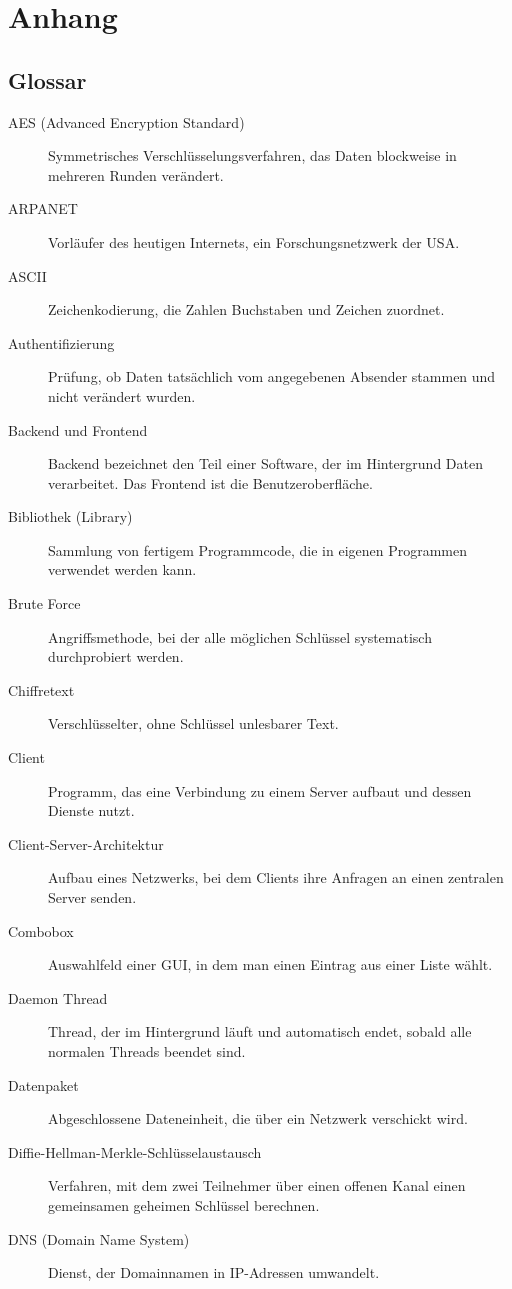\chapter{Anhang}
\label{chap:Anhang}

\section{Glossar}

\begin{description}
\item[AES (Advanced Encryption Standard)] Symmetrisches Verschlüsselungsverfahren, das Daten blockweise in mehreren Runden verändert.
\item[ARPANET] Vorläufer des heutigen Internets, ein Forschungsnetzwerk der USA.
\item[ASCII] Zeichenkodierung, die Zahlen Buchstaben und Zeichen zuordnet.
\item[Authentifizierung] Prüfung, ob Daten tatsächlich vom angegebenen Absender stammen und nicht verändert wurden.
\item[Backend und Frontend] Backend bezeichnet den Teil einer Software, der im Hintergrund Daten verarbeitet. Das Frontend ist die Benutzeroberfläche.
\item[Bibliothek (Library)] Sammlung von fertigem Programmcode, die in eigenen Programmen verwendet werden kann.
\item[Brute Force] Angriffsmethode, bei der alle möglichen Schlüssel systematisch durchprobiert werden.
\item[Chiffretext] Verschlüsselter, ohne Schlüssel unlesbarer Text.
\item[Client] Programm, das eine Verbindung zu einem Server aufbaut und dessen Dienste nutzt.
\item[Client-Server-Architektur] Aufbau eines Netzwerks, bei dem Clients ihre Anfragen an einen zentralen Server senden.
\item[Combobox] Auswahlfeld einer GUI, in dem man einen Eintrag aus einer Liste wählt.
\item[Daemon Thread] Thread, der im Hintergrund läuft und automatisch endet, sobald alle normalen Threads beendet sind.
\item[Datenpaket] Abgeschlossene Dateneinheit, die über ein Netzwerk verschickt wird.
\item[Diffie-Hellman-Merkle-Schlüsselaustausch] Verfahren, mit dem zwei Teilnehmer über einen offenen Kanal einen gemeinsamen geheimen Schlüssel berechnen.
\item[DNS (Domain Name System)] Dienst, der Domainnamen in IP-Adressen umwandelt.

\end{description}

